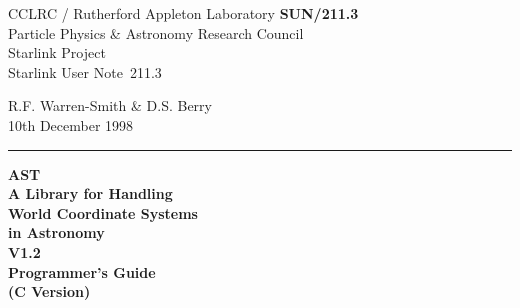 \documentclass[twoside,11pt]{article}
\newcommand{\stardoccategory}  {Starlink User Note}
\newcommand{\stardocinitials}  {SUN}
\newcommand{\stardocnumber}    {211.3}
\newcommand{\stardocauthors}   {R.F. Warren-Smith \& D.S. Berry}
\newcommand{\stardocdate}      {10th December 1998}
\newcommand{\stardoctitle}     {AST\\
                                A Library for Handling\\
                                World Coordinate Systems\\
                                in Astronomy}
\newcommand{\stardocversion}   {V1.2}
\newcommand{\stardocmanual}    {Programmer's Guide\\(C Version)}
\newcommand{\stardocname}{\stardocinitials /\stardocnumber}
\newenvironment{latexonly}{}{}
\begin{document}
\thispagestyle{empty}

\begin{latexonly}
   CCLRC / {\sc Rutherford Appleton Laboratory} \hfill {\bf \stardocname}\\
   {\large Particle Physics \& Astronomy Research Council}\\
   {\large Starlink Project\\}
   {\large \stardoccategory\ \stardocnumber}
   \begin{flushright}
   \stardocauthors\\
   \stardocdate
   \end{flushright}
   \vspace{-4mm}
   \rule{\textwidth}{0.5mm}
   \vspace{-7mm}
   \begin{center}
   {\Huge\bf  \stardoctitle \\ [2.0ex]}
   {\LARGE\bf \stardocversion \\ [1.0ex]}
   {\Huge\bf  \stardocmanual}
   \end{center}


\end{latexonly}
\end{document}
